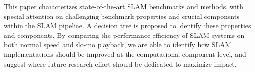 This paper characterizes state-of-the-art SLAM benchmarks 
and methods, with special attention on challenging 
benchmark properties and crucial components 
within the SLAM pipeline.  A decision tree is proposed 
to identify these properties and components.  By comparing the performance efficiency 
of SLAM systems on both normal speed and slo-mo playback, we are able 
to identify how SLAM implementations should be improved at the 
computational component level, and suggest where future research effort
should be dedicated to maximize impact.